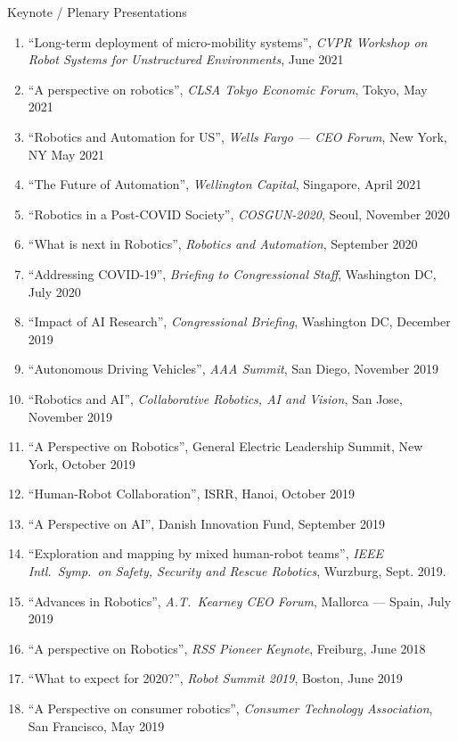 \documentclass{article}
\begin{document}
\begin{cv}
\begin{cvlist}{Keynote / Plenary Presentations}
\begin{enumerate}
{          Annual Meeting}, July 2021
    \item ``Long-term deployment of micro-mobility systems'', {\em CVPR Workshop on
          Robot Systems for Unstructured Environments}, June 2021
    \item ``A perspective on robotics'', {\em CLSA Tokyo Economic Forum}, Tokyo, May
          2021
    \item ``Robotics and Automation for US'', {\em Wells Fargo --- CEO Forum}, New
          York, NY May 2021
    \item ``The Future of Automation'', {\em Wellington Capital}, Singapore,
          April 2021
    \item ``Robotics in a Post-COVID Society'', {\em COSGUN-2020}, Seoul, November
          2020
    \item ``What is next in Robotics'', {\em Robotics and Automation}, September
          2020
    \item ``Addressing COVID-19'', {\em Briefing to Congressional Staff}, Washington
          DC, July 2020
    \item ``Impact of AI Research'', {\em Congressional Briefing}, Washington DC,
          December 2019
    \item ``Autonomous Driving Vehicles'', {\em AAA Summit}, San Diego, November
          2019
    \item ``Robotics and AI'', {\em Collaborative Robotics, AI and Vision}, San
          Jose, November 2019
    \item ``A Perspective on Robotics'', General Electric Leadership Summit, New
          York, October 2019
    \item ``Human-Robot Collaboration'', ISRR, Hanoi, October 2019
    \item ``A Perspective on AI'', Danish Innovation Fund, September 2019
  \item ``Exploration and mapping by mixed human-robot teams'', {\em
      IEEE Intl.\ Symp.\ on Safety, Security and Rescue Robotics}, Wurzburg, Sept. 2019.
  \item  ``Advances in Robotics'', {\em A.T.\ Kearney CEO Forum}, Mallorca --- Spain, July 2019
  \item ``A perspective on Robotics'', {\em RSS Pioneer Keynote}, Freiburg, June 2018
  \item ``What to expect for 2020?'', {\em Robot Summit 2019}, Boston, June 2019
  \item ``A Perspective on consumer robotics'', {\em Consumer Technology Association}, San Francisco, May 2019

\end{enumerate}
\end{cvlist}
\end{cv}
\end{document}
